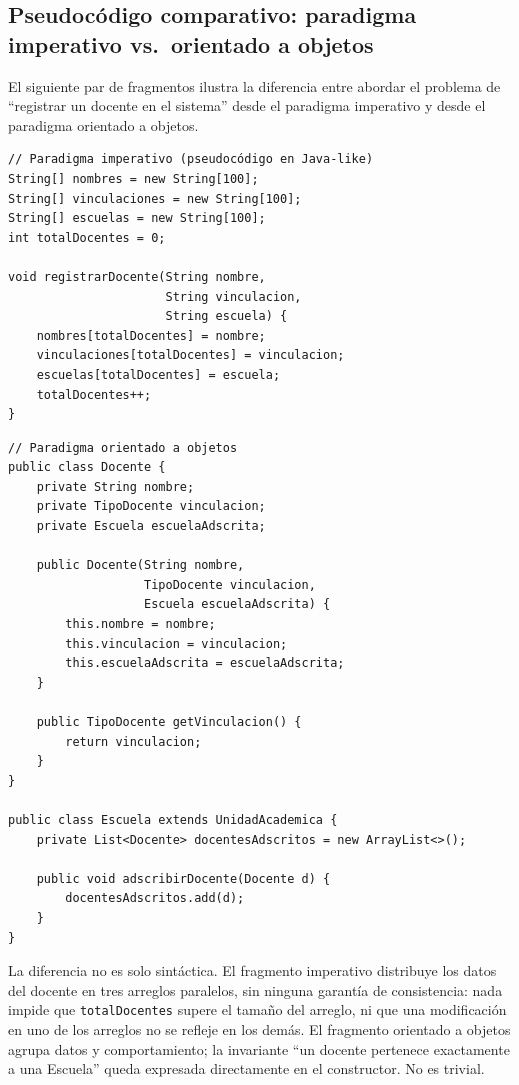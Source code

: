 \subsection*{Pseudocódigo comparativo: paradigma imperativo vs.\ orientado a objetos}

El siguiente par de fragmentos ilustra la diferencia entre abordar el
problema de ``registrar un docente en el sistema'' desde el paradigma
imperativo y desde el paradigma orientado a objetos.

\begin{lstlisting}[style=javaStyle,
  caption={Paradigma imperativo: registrar docente mediante procedimiento y
    arreglo global.},
  label={lst:imperativo-docente}]
// Paradigma imperativo (pseudocódigo en Java-like)
String[] nombres = new String[100];
String[] vinculaciones = new String[100];
String[] escuelas = new String[100];
int totalDocentes = 0;

void registrarDocente(String nombre,
                      String vinculacion,
                      String escuela) {
    nombres[totalDocentes] = nombre;
    vinculaciones[totalDocentes] = vinculacion;
    escuelas[totalDocentes] = escuela;
    totalDocentes++;
}
\end{lstlisting}

\begin{lstlisting}[style=javaStyle,
  caption={Paradigma orientado a objetos: registrar docente encapsulando
    estado y comportamiento en la clase \texttt{Escuela}.},
  label={lst:oo-docente}]
// Paradigma orientado a objetos
public class Docente {
    private String nombre;
    private TipoDocente vinculacion;
    private Escuela escuelaAdscrita;

    public Docente(String nombre,
                   TipoDocente vinculacion,
                   Escuela escuelaAdscrita) {
        this.nombre = nombre;
        this.vinculacion = vinculacion;
        this.escuelaAdscrita = escuelaAdscrita;
    }

    public TipoDocente getVinculacion() {
        return vinculacion;
    }
}

public class Escuela extends UnidadAcademica {
    private List<Docente> docentesAdscritos = new ArrayList<>();

    public void adscribirDocente(Docente d) {
        docentesAdscritos.add(d);
    }
}
\end{lstlisting}

La diferencia no es solo sintáctica. El fragmento imperativo distribuye los
datos del docente en tres arreglos paralelos, sin ninguna garantía de
consistencia: nada impide que \texttt{totalDocentes} supere el tamaño del
arreglo, ni que una modificación en uno de los arreglos no se refleje en
los demás. El fragmento orientado a objetos agrupa datos y comportamiento;
la invariante ``un docente pertenece exactamente a una Escuela'' queda
expresada directamente en el constructor.
No es trivial.

